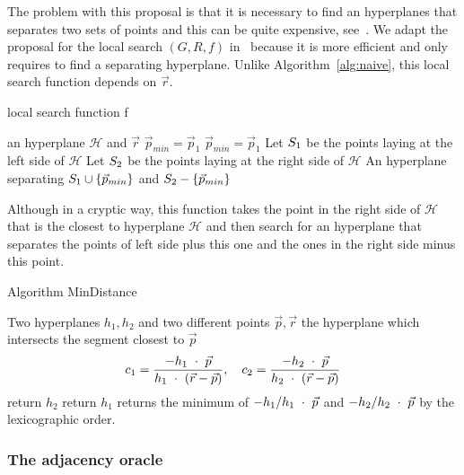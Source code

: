 \documentclass{article}
\newcommand{\cH}{\mathcal{H}}
\begin{document}
The problem with this proposal is that it is necessary to find an
hyperplanes that separates two sets of points and this can be quite
expensive, see~\cite{Elizondo06}. 
We adapt the proposal for the local search $(G, R, f)$ 
in~\cite{SleumerMsc} because it is more efficient and only requires to
find a separating hyperplane. Unlike Algorithm~\ref{alg:naive}, this
local search function depends on $\vec{r}$.
\begin{algorithm}
  \caption{local search function f}
  \label{alg:sleumer}
  \begin{algorithmic}
  \REQUIRE an hyperplane $\cH$ and $\vec{r}$
  \STATE $\vec{p}_{min}=\vec{p}_1$
  \IF{$\vec{p}_k$==$MinDistance(\vec{p}_{min}, \vec{p}_k,\cH,\vec{r})$}
  \STATE $\vec{p}_{min}=\vec{p}_1$
  \ENDIF
  \ENDFOR
  \STATE Let $S_1$ be the points laying at the left side of $\cH$ 
  \STATE Let $S_2$ be the points laying at the right side of $\cH$
  \RETURN An hyperplane separating $S_1\cup \{\vec{p}_{min}\}$ and 
  $S_2 - \{\vec{p}_{min}\}$
  \end{algorithmic}
\end{algorithm}
Although in a   cryptic way, this function takes the point in the right
side of $\cH$ that is the closest to hyperplane $\cH$ and then search
for an hyperplane that separates the points of left side plus this
one and the ones in the right side minus this point.
\begin{algorithm}
  \caption{Algorithm MinDistance}
  \begin{algorithmic}
  \REQUIRE Two hyperplanes $h_1,h_2$ and two different 
  points $\vec{p},\vec{r}$
  \ENSURE the hyperplane which intersects the segment closest to $\vec{p}$ 
  \STATE
  \begin{equation*}
    c_1=\frac{-h_1\ \cdot \ \vec{p}}{h_1\ \cdot \ (\vec{r}-\vec{p})},
    \quad c_2=
    \frac{-h_2\ \cdot \ \vec{p}}{h_2\ \cdot \ (\vec{r}-\vec{p})}
  \end{equation*}
  \STATE return $h_2$
  \STATE return $h_1$
  \ELSE
  \STATE returns the minimum of $-h_1/h_1\ \cdot \ \vec{p}$ and 
  $-h_2/h_2\ \cdot \ \vec{p}$ by the lexicographic order.
  \ENDIF
  \end{algorithmic}
\end{algorithm} 

\subsubsection{The adjacency oracle}
\end{document}
